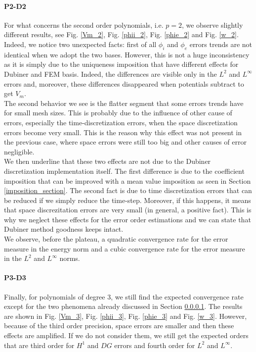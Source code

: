 \documentclass[a4paper,11pt]{article}
\begin{document}
\paragraph{P2-D2} \label{P2-D2}
\noindent  For what concerns the second order polynomials, i.e. $p=2$, we observe slightly different results, see Fig. \ref{Vm_2}, Fig. \ref{phii_2}, Fig. \ref{phie_2} and Fig. \ref{w_2}.  \\
\noindent Indeed, we notice two unexpected facts: first of all $\phi_i$ and $\phi_e$ errors trends are not identical when we adopt the two bases. However, this is not a huge inconsistency as it is simply due to the uniqueness imposition that have different effects for Dubiner and FEM basis. Indeed, the differences are visible only in the $L^2$ and $L^\infty$ errors and, moreover, these differences disappeared when potentials subtract to get $V_m$. \\
The second behavior we see is the flatter segment that some errors trends have for small mesh sizes. This is probably due to the influence of other cause of errors, especially the time-discretization errors, when the space discretization errors become very small. This is the reason why this effect was not present in the previous case, where space errors were still too big and other causes of error negligible. \\
We then underline that these two effects are not due to the Dubiner discretization implementation itself. The first difference is due to the coefficient imposition that can be improved with a mean value imposition as seen in Section \ref{imposition_section}. The second fact is due to time discretization errors that can be reduced if we simply reduce the time-step. Moreover, if this happens, it means that space discrezitation errors are very small (in general, a positive fact). This is why we neglect these effects for the error order estimations and we can state that Dubiner method goodness keeps intact. \\
We observe, before the plateau, a quadratic convergence rate for the error measure in the energy norm and a cubic convergence rate for the error measure in the $L^2$ and $L^\infty$ norms.\\
\paragraph{P3-D3}
\noindent Finally, for polynomials of degree 3, we still find the expected convergence rate except for the two phenomena already discussed in Section \ref{P2-D2}. The results are shown in Fig. \ref{Vm_3}, Fig. \ref{phii_3}, Fig. \ref{phie_3} and Fig. \ref{w_3}. However, because of the third order precision, space errors are smaller and then these effects are amplified. If we do not consider them, we still get the expected orders that are third order for $H^1$ and $DG$ errors and fourth order for $L^2$ and $L^\infty$.\\
\end{document}

